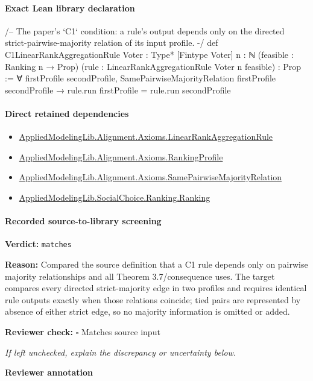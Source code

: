 \documentclass[10pt]{article}
\newcommand{\reviewerbox}{%
  \par\noindent\fbox{\parbox{0.96\linewidth}{\rule{0pt}{0.38in}}}\par
}
\newcommand{\reviewmatch}[1]{%
  \par\noindent\textbf{Reviewer check:} $\square$\; #1\par
  \noindent\emph{If left unchecked, explain the discrepancy or uncertainty below.}\par
}
\begin{document}
\paragraph{Exact Lean library declaration}
\begin{ReviewVerbatim}
/--
The paper's `C1` condition: a rule's output depends only on the directed
strict-pairwise-majority relation of its input profile.
-/
def C1LinearRankAggregationRule {Voter : Type*} [Fintype Voter] {n : ℕ}
    (feasible : Ranking n → Prop) (rule : LinearRankAggregationRule Voter n feasible) : Prop :=
  ∀ firstProfile secondProfile,
    SamePairwiseMajorityRelation firstProfile secondProfile →
      rule.run firstProfile = rule.run secondProfile
\end{ReviewVerbatim}

\paragraph{Direct retained dependencies}
\begin{itemize}\raggedright
\item \hyperlink{library-prerequisite-43447e121a1884f9}{Applied\allowbreak{}Modeling\allowbreak{}Lib.\allowbreak{}Alignment.\allowbreak{}Axioms.\allowbreak{}Linear\allowbreak{}Rank\allowbreak{}Aggregation\allowbreak{}Rule}
\item \hyperlink{library-prerequisite-9bded048a60dfe0a}{Applied\allowbreak{}Modeling\allowbreak{}Lib.\allowbreak{}Alignment.\allowbreak{}Axioms.\allowbreak{}Ranking\allowbreak{}Profile}
\item \hyperlink{library-prerequisite-8feb80e31f32c9f1}{Applied\allowbreak{}Modeling\allowbreak{}Lib.\allowbreak{}Alignment.\allowbreak{}Axioms.\allowbreak{}Same\allowbreak{}Pairwise\allowbreak{}Majority\allowbreak{}Relation}
\item \hyperlink{library-prerequisite-5cde54446d1ae021}{Applied\allowbreak{}Modeling\allowbreak{}Lib.\allowbreak{}Social\allowbreak{}Choice.\allowbreak{}Ranking.\allowbreak{}Ranking}
\end{itemize}
\paragraph{Recorded source-to-library screening}
\textbf{Verdict:} \texttt{matches}
\\
{\raggedright
\textbf{Reason:} Compared the source definition that a C1 rule depends only on pairwise majority relationships and all Theorem 3.\allowbreak{}7/\allowbreak{}consequence uses.\allowbreak{} The target compares every directed strict-\allowbreak{}majority edge in two profiles and requires identical rule outputs exactly when those relations coincide;\allowbreak{} tied pairs are represented by absence of either strict edge, so no majority information is omitted or added.\allowbreak{}
\par}
\reviewmatch{Matches source input}
\noindent\textbf{Reviewer annotation}\par
\reviewerbox
\clearpage
\hypertarget{library-prerequisite-5fa7bdb49b050adf}{}
\end{document}
